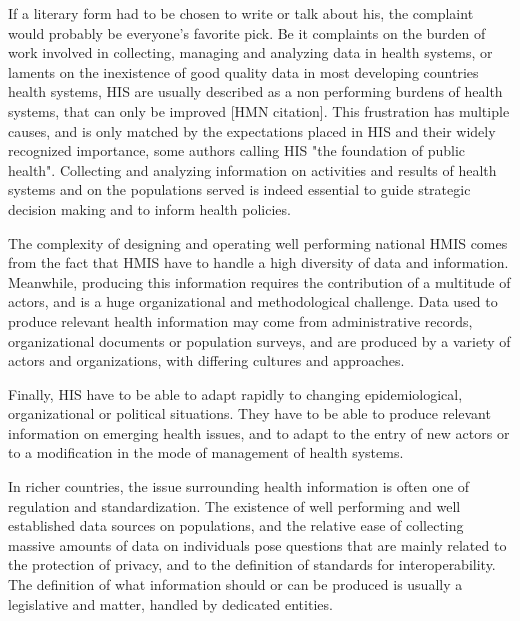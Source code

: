 If a literary form had to be chosen to write or talk about \gls*{his}, the complaint would probably be everyone's favorite pick. Be it complaints on the burden of work involved in collecting, managing and analyzing data in health systems, or laments on the inexistence of good quality data in most developing countries health systems, HIS are usually described as a non performing burdens of health systems, that can only be improved [HMN citation]. This frustration has multiple causes, and is only matched by the expectations placed in HIS and their widely recognized importance, some authors calling HIS "the foundation of public health"\cite{foundph}. Collecting and analyzing information on activities and results of health systems and on the populations served is indeed essential to guide strategic decision making and to inform health policies.

The complexity of designing and operating well performing national HMIS comes from the fact that HMIS have to handle a high diversity of data and information. Meanwhile, producing this information requires the contribution of a multitude of actors, and is a huge organizational and methodological challenge. Data used to produce relevant health information may come from administrative records, organizational documents or population surveys, and are produced by a variety of actors and organizations, with differing cultures and approaches.

Finally, HIS have to be able to adapt rapidly to changing epidemiological, organizational or political situations. They have to be able to produce relevant information on emerging health issues, and to adapt to the entry of new actors or to a modification in the mode of management of health systems.

In richer countries, the issue surrounding health information is often one of regulation and standardization. The  existence of well performing and well established data sources on populations, and the relative ease of collecting massive amounts of data on individuals pose questions that are mainly related to the protection of privacy, and to the definition of standards for interoperability. The definition of what information should or can be produced is usually a legislative and matter, handled by dedicated entities.


